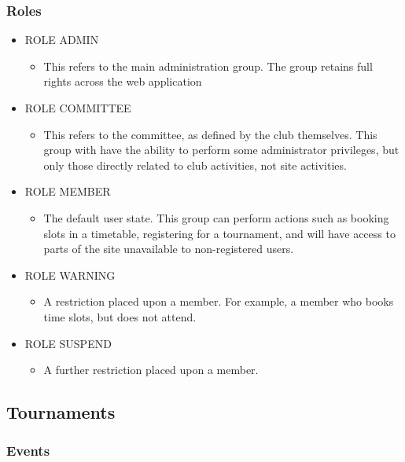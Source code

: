 \subsubsection{Roles}
\begin{table}[H]
\begin{itemize}
\item ROLE ADMIN
\begin{itemize}
\item This refers to the main administration group. The group retains full rights across the web application
\end{itemize}
\item ROLE COMMITTEE
\begin{itemize}
\item This refers to the committee, as defined by the club themselves. This group with have the ability to perform some administrator privileges, but only those directly related to club activities, not site activities.
\end{itemize}
\item ROLE MEMBER
\begin{itemize}
\item The default user state. This group can perform actions such as booking slots in a timetable, registering for a tournament, and will have access to parts of the site unavailable to non-registered users.
\end{itemize}
\item ROLE WARNING 
\begin{itemize}
\item A restriction placed upon a member. For example, a member who books time slots, but does not attend.
\end{itemize}
\item ROLE SUSPEND
\begin{itemize}
\item A further restriction placed upon a member.
\end{itemize}
\end{itemize}
\label{fig:secRoles}
\end{table}

\subsection{Tournaments}

\subsubsection{Events}


